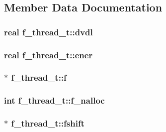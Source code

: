 \subsection{\-Member \-Data \-Documentation}
\hypertarget{structf__thread__t_a3da00697333a73d010e2a9120a994cdf}{
\subsubsection[{dvdl}]{\setlength{\rightskip}{0pt plus 5cm}real {\bf f\-\_\-thread\-\_\-t\-::dvdl}}}\label{structf__thread__t_a3da00697333a73d010e2a9120a994cdf}
\hypertarget{structf__thread__t_a17f3dfad05088d20913bed117da36c0a}{
\subsubsection[{ener}]{\setlength{\rightskip}{0pt plus 5cm}real {\bf f\-\_\-thread\-\_\-t\-::ener}}}\label{structf__thread__t_a17f3dfad05088d20913bed117da36c0a}
\hypertarget{structf__thread__t_a8b47c349ecbfb38fad1340d0a8b9de98}{
\subsubsection[{f}]{ $\ast$ {\bf f\-\_\-thread\-\_\-t\-::f}}}\label{structf__thread__t_a8b47c349ecbfb38fad1340d0a8b9de98}
\hypertarget{structf__thread__t_a79373af526b09405f6757a5bc011a612}{
\subsubsection[{f\-\_\-nalloc}]{\setlength{\rightskip}{0pt plus 5cm}int {\bf f\-\_\-thread\-\_\-t\-::f\-\_\-nalloc}}}\label{structf__thread__t_a79373af526b09405f6757a5bc011a612}
\hypertarget{structf__thread__t_a497abcf414ea388f52c18f38ab204b6d}{
\subsubsection[{fshift}]{ $\ast$ {\bf f\-\_\-thread\-\_\-t\-::fshift}}}\label{structf__thread__t_a497abcf414ea388f52c18f38ab204b6d}
